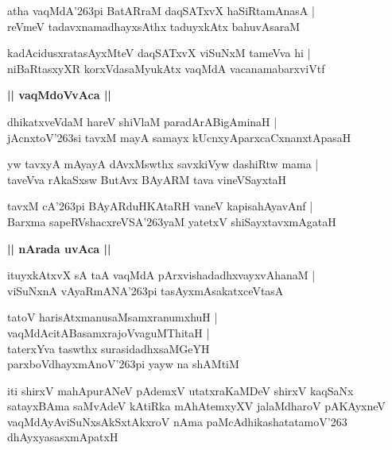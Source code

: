 \documentclass[twoside,12pt,openright]{book}
\def\S{\char'263}
\newcounter{shloka}[chapter]
\def\uvaca#1{\centerline{{\large\textbf{#1}}}}
\begin{document}
\begin{shloka}%
atha vaqMdA\S pi BatARraM daqSATxvX haSiRtamAnasA |\\
reVmeV tadavxnamadhayxsAthx taduyxkAtx bahuvAsaraM 
\end{shloka}

\begin{shloka}%
kadAcidusxratasAyxMteV daqSATxvX viSuNxM tameVva hi |\\
niBaRtasxyXR korxVdasaMyukAtx vaqMdA vacanamabarxviVtf
\end{shloka}

\uvaca{|| vaqMdoVvAca ||}

\begin{shloka}%
dhikatxveVdaM hareV shiVlaM paradArABigAminaH |\\
jAcnxtoV\S si tavxM mayA samayx kUcnxyAparxcaCxnanxtApasaH 
\end{shloka}

\begin{shloka}%
yw tavxyA mAyayA dAvxMswthx savxkiVyw dashiRtw mama |\\
taveVva rAkaSxsw  ButAvx BAyARM tava vineVSayxtaH 
\end{shloka}

\begin{shloka}%
tavxM cA\S pi BAyARduHKAtaRH vaneV kapisahAyavAnf |\\
Barxma  sapeRVshacxreVSA\S yaM yatetxV shiSayxtavxmAgataH 
\end{shloka}

\uvaca{|| nArada uvAca ||}

\begin{shloka}%
ituyxkAtxvX sA taA vaqMdA pArxvishadadhxvayxvAhanaM |\\
viSuNxnA vAyaRmANA\S pi  tasAyxmAsakatxceVtasA
\end{shloka}

\begin{shloka}%
tatoV harisAtxmanusaMsamxranumxhuH |\\
vaqMdAcitABasamxrajoVvaguMThitaH |\\
taterxYva taswthx surasidadhxsaMGeYH \\
parxboVdhayxmAnoV\S pi yayw na shAMtiM 
\end{shloka}


\begin{center}
iti shirxV mahApurANeV pAdemxV utatxraKaMDeV shirxV kaqSaNx satayxBAma saMvAdeV kAtiRka 
mAhAtemxyXV jalaMdharoV pAKAyxneV vaqMdAyAviSuNxsAkSxtAkxroV nAma paMcAdhikashatatamoV\S 
dhAyxyasasxmApatxH 
\end{center}
\end{document}
